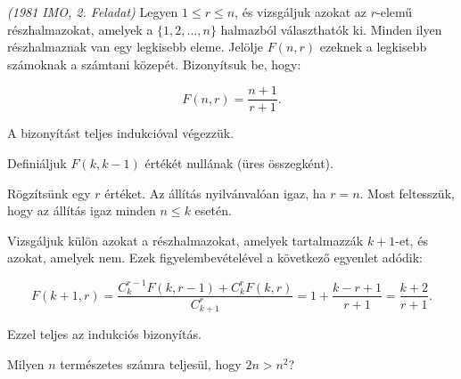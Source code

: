 \begin{extraproblem}
\emph{ (1981 IMO, 2. Feladat)} Legyen $1\leq r\leq n$, és vizsgáljuk
azokat az $r$-elemű részhalmazokat, amelyek a $\{1,2,\dots,n\}$
halmazból választhatók ki. Minden ilyen részhalmaznak van egy legkisebb
eleme. Jelölje $F(n,r)$ ezeknek a legkisebb számoknak a számtani
közepét. Bizonyítsuk be, hogy:

\[
F(n,r)=\frac{n+1}{r+1}.
\]
\end{extraproblem}

\begin{solution}
A bizonyítást teljes indukcióval végezzük.

Definiáljuk $F(k,k-1)$ értékét nullának (üres összegként).

Rögzítsünk egy $r$ értéket. Az állítás nyilvánvalóan igaz, ha $r=n$.
Most feltesszük, hogy az állítás igaz minden $n\leq k$ esetén.

Vizsgáljuk külön azokat a részhalmazokat, amelyek tartalmazzák $k+1$-et,
és azokat, amelyek nem. Ezek figyelembevételével a következő egyenlet
adódik:

\[
F(k+1,r)=\frac{{C_{k}^{r-1}}F(k,r-1)+{C_{k}^{r}}F(k,r)}{{C_{k+1}^{r}}}=1+\frac{k-r+1}{r+1}=\frac{k+2}{r+1}.
\]

Ezzel teljes az indukciós bizonyítás. 
\end{solution}
\begin{extraproblem}
Milyen $n$ természetes számra teljesül, hogy $2n>n^{2}$?
\end{extraproblem}


